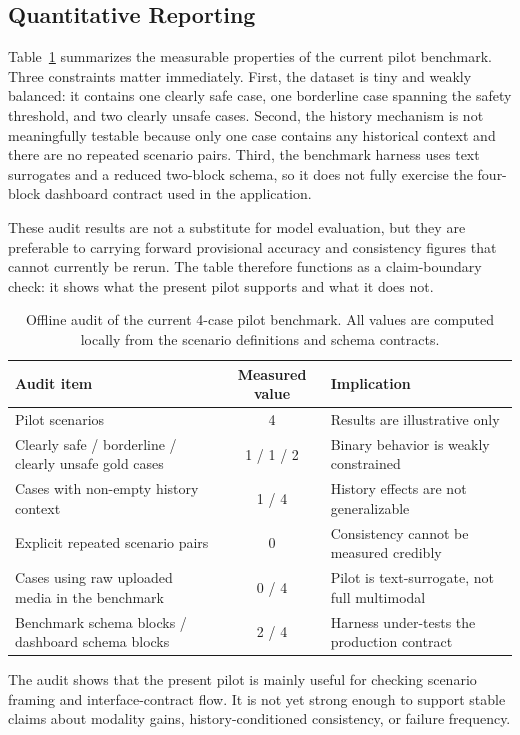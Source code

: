\documentclass[conference]{IEEEtran}
\begin{document}
\subsection{Quantitative Reporting}
Table~\ref{tab:ablation} summarizes the measurable properties of the current pilot benchmark. Three constraints matter immediately. First, the dataset is tiny and weakly balanced: it contains one clearly safe case, one borderline case spanning the safety threshold, and two clearly unsafe cases. Second, the history mechanism is not meaningfully testable because only one case contains any historical context and there are no repeated scenario pairs. Third, the benchmark harness uses text surrogates and a reduced two-block schema, so it does not fully exercise the four-block dashboard contract used in the application.

These audit results are not a substitute for model evaluation, but they are preferable to carrying forward provisional accuracy and consistency figures that cannot currently be rerun. The table therefore functions as a claim-boundary check: it shows what the present pilot supports and what it does not.

\begin{table}[t]
\caption{Offline audit of the current 4-case pilot benchmark. All values are computed locally from the scenario definitions and schema contracts.}
\label{tab:ablation}
\centering
\footnotesize
\begin{tabularx}{\textwidth}{@{}lcl@{}}
\toprule
Audit item & Measured value & Implication \\
\midrule
Pilot scenarios & 4 & Results are illustrative only \\
Clearly safe / borderline / clearly unsafe gold cases & 1 / 1 / 2 & Binary behavior is weakly constrained \\
Cases with non-empty history context & 1 / 4 & History effects are not generalizable \\
Explicit repeated scenario pairs & 0 & Consistency cannot be measured credibly \\
Cases using raw uploaded media in the benchmark & 0 / 4 & Pilot is text-surrogate, not full multimodal \\
Benchmark schema blocks / dashboard schema blocks & 2 / 4 & Harness under-tests the production contract \\
\bottomrule
\end{tabularx}
\end{table}

\noindent The audit shows that the present pilot is mainly useful for checking scenario framing and interface-contract flow. It is not yet strong enough to support stable claims about modality gains, history-conditioned consistency, or failure frequency.
\end{document}
